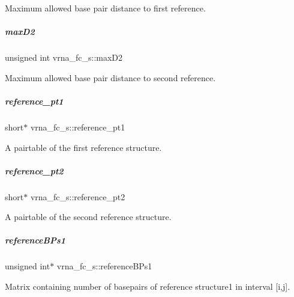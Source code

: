Maximum allowed base pair distance to first reference. 

\mbox{\label{group__fold__compound_a38695774fd396c892f9a70d39978b231}} 
\subparagraph{\texorpdfstring{max\+D2}{maxD2}}
{\footnotesize\ttfamily unsigned int vrna\+\_\+fc\+\_\+s\+::max\+D2}



Maximum allowed base pair distance to second reference. 

\mbox{\label{group__fold__compound_aa279ba4bd0ff541d435d3a049687f3ac}} 
\subparagraph{\texorpdfstring{reference\+\_\+pt1}{reference\_pt1}}
{\footnotesize\ttfamily short$\ast$ vrna\+\_\+fc\+\_\+s\+::reference\+\_\+pt1}



A pairtable of the first reference structure. 

\mbox{\label{group__fold__compound_a926ad253f5f0eed642bc227493d0278d}} 
\subparagraph{\texorpdfstring{reference\+\_\+pt2}{reference\_pt2}}
{\footnotesize\ttfamily short$\ast$ vrna\+\_\+fc\+\_\+s\+::reference\+\_\+pt2}



A pairtable of the second reference structure. 

\mbox{\label{group__fold__compound_a62a8d4ab8dadffbf09da917adff6c71e}} 
\subparagraph{\texorpdfstring{reference\+B\+Ps1}{referenceBPs1}}
{\footnotesize\ttfamily unsigned int$\ast$ vrna\+\_\+fc\+\_\+s\+::reference\+B\+Ps1}



Matrix containing number of basepairs of reference structure1 in interval \mbox{[}i,j\mbox{]}. 


